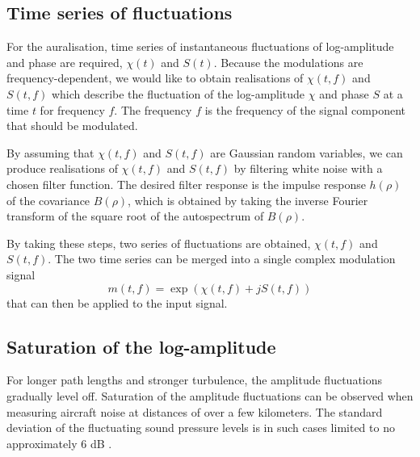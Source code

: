 \subsection{Time series of fluctuations}
For the auralisation, time series of instantaneous fluctuations of log-amplitude and phase are required, $\chi(t)$ and $S(t)$.
Because the modulations are frequency-dependent, we would like to obtain realisations of $\chi(t, f)$ and $S(t, f)$ which describe the fluctuation of the log-amplitude $\chi$ and phase $S$ at a time $t$ for frequency $f$.
The frequency $f$ is the frequency of the signal component that should be modulated.

By assuming that $\chi(t,f)$ and $S(t,f)$ are Gaussian random variables, we can produce realisations of $\chi(t,f)$ and $S(t,f)$ by filtering white noise with a chosen filter function.
The desired filter response is the impulse response $h(\rho)$ of the covariance $B(\rho)$, which is obtained by taking the inverse Fourier transform of the square root of the autospectrum of $B(\rho)$.

By taking these steps, two series of fluctuations are obtained, $\chi(t, f)$ and $S(t, f)$. 
The two time series can be merged into a single complex modulation signal
\begin{equation}
 m(t,f) = \exp{\left( \chi\left(t,f\right) + j S\left(t, f\right) \right)}
\end{equation}
that can then be applied to the input signal.

\subsection{Saturation of the log-amplitude}
For longer path lengths and stronger turbulence, the amplitude fluctuations gradually level off.
Saturation of the amplitude fluctuations can be observed when measuring aircraft noise at distances of over a few kilometers.
The standard deviation of the fluctuating sound pressure levels is in such cases limited to no approximately 6 dB \cite{Daigle1983,Piercy1974}.

